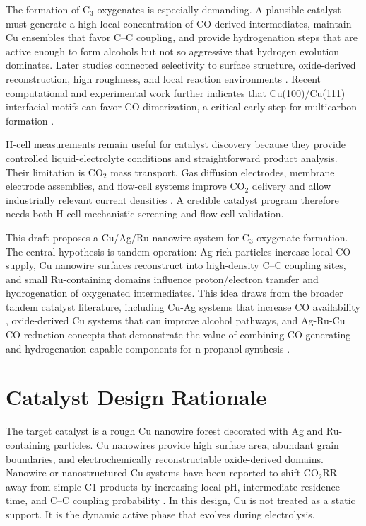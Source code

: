 \documentclass[11pt]{article}
\newcommand{\coTwo}{CO$_2$}
\newcommand{\coTwoRR}{CO$_2$RR}
\newcommand{\cThree}{C$_3$}
\begin{document}
The formation of \cThree{} oxygenates is especially demanding. A plausible catalyst must generate a high local concentration of CO-derived intermediates, maintain Cu ensembles that favor C--C coupling, and provide hydrogenation steps that are active enough to form alcohols but not so aggressive that hydrogen evolution dominates. Later studies connected selectivity to surface structure, oxide-derived reconstruction, high roughness, and local reaction environments \cite{Nitopi2019,Ma2016,Miao2022}. Recent computational and experimental work further indicates that Cu(100)/Cu(111) interfacial motifs can favor CO dimerization, a critical early step for multicarbon formation \cite{Wu2022}.

H-cell measurements remain useful for catalyst discovery because they provide controlled liquid-electrolyte conditions and straightforward product analysis. Their limitation is \coTwo{} mass transport. Gas diffusion electrodes, membrane electrode assemblies, and flow-cell systems improve \coTwo{} delivery and allow industrially relevant current densities \cite{Dinh2020,Liu2020,Jiang2023}. A credible catalyst program therefore needs both H-cell mechanistic screening and flow-cell validation.

This draft proposes a Cu/Ag/Ru nanowire system for \cThree{} oxygenate formation. The central hypothesis is tandem operation: Ag-rich particles increase local CO supply, Cu nanowire surfaces reconstruct into high-density C--C coupling sites, and small Ru-containing domains influence proton/electron transfer and hydrogenation of oxygenated intermediates. This idea draws from the broader tandem catalyst literature, including Cu-Ag systems that increase CO availability \cite{Jiang2023}, oxide-derived Cu systems that can improve alcohol pathways, and Ag-Ru-Cu CO reduction concepts that demonstrate the value of combining CO-generating and hydrogenation-capable components for n-propanol synthesis \cite{Li2022}.

\section{Catalyst Design Rationale}

The target catalyst is a rough Cu nanowire forest decorated with Ag and Ru-containing particles. Cu nanowires provide high surface area, abundant grain boundaries, and electrochemically reconstructable oxide-derived domains. Nanowire or nanostructured Cu systems have been reported to shift \coTwoRR{} away from simple C1 products by increasing local pH, intermediate residence time, and C--C coupling probability \cite{Ma2016,Nitopi2019}. In this design, Cu is not treated as a static support. It is the dynamic active phase that evolves during electrolysis.
\end{document}
